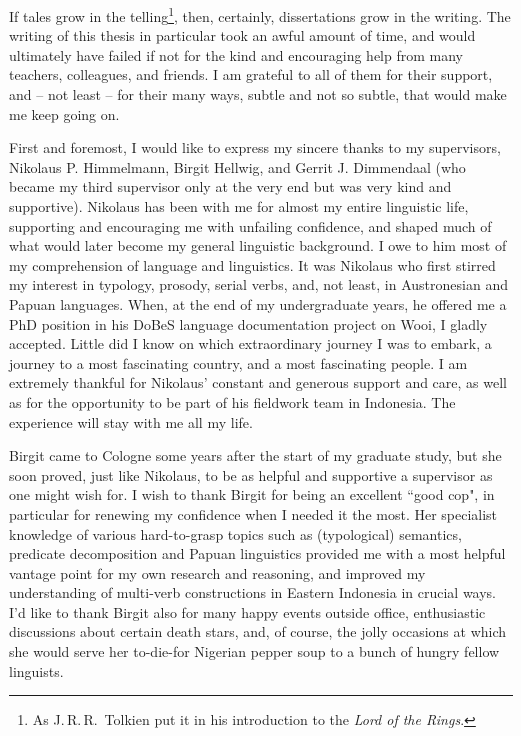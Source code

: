 
If tales grow in the telling\footnote{As J.\,R.\,R.\, Tolkien put it in his introduction to the \textit{Lord of the Rings}.}, then, certainly, dissertations grow in the writing. The writing of this thesis in particular took an awful amount of time, and would ultimately have failed if not for the kind and encouraging help from many teachers, colleagues, and friends. I am grateful to all of them for their support, and -- not least -- for their many ways, subtle and not so subtle, that would make me keep going on.

First and foremost, I would like to express my sincere thanks to my supervisors, Nikolaus P. Himmelmann, Birgit Hellwig, and Gerrit J. Dimmendaal (who became my third supervisor only at the very end but was very kind and supportive). Nikolaus has been with me for almost my entire linguistic life, supporting and encouraging me with unfailing confidence, and shaped much of what would later become my general linguistic background. I owe to him most of my comprehension of language and linguistics. It was Nikolaus who first stirred my interest in typology, prosody, serial verbs, and, not least, in Austronesian and Papuan languages. When, at the end of my undergraduate years, he offered me a PhD position in his DoBeS language documentation project on Wooi, I gladly accepted. Little did I know on which extraordinary journey I was to embark, a journey to a most fascinating country, and a most fascinating people. I am extremely thankful for Nikolaus' constant and generous support and care, as well as for the opportunity to be part of his fieldwork team in Indonesia. The experience will stay with me all my life.

Birgit came to Cologne some years after the start of my graduate study, but she soon proved, just like Nikolaus, to be as helpful and supportive a supervisor as one might wish for. I wish to thank Birgit for being an excellent ``good cop", in particular for renewing my confidence when I needed it the most. Her specialist knowledge of various hard-to-grasp topics such as (typological) semantics, predicate decomposition and Papuan linguistics provided me with a most helpful vantage point for my own research and reasoning, and improved my understanding of multi-verb constructions in Eastern Indonesia in crucial ways. I'd like to thank Birgit also for many happy events outside office, enthusiastic discussions about certain death stars, and, of course, the jolly occasions at which she would serve her to-die-for Nigerian pepper soup to a bunch of hungry fellow linguists.

